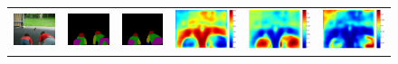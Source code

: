\begin{figure}
\begin{tabular}{c c c c c c}
   \includegraphics[height=0.1\linewidth]{fig/voc10_part/img/2010_005293.jpg} &
   \includegraphics[height=0.1\linewidth]{fig/voc10_part/res_baseline/2010_005293.png} &
   \includegraphics[height=0.1\linewidth]{fig/voc10_part/res_sharenet/2010_005293.png} &
   \includegraphics[height=0.1\linewidth]{fig/voc10_part/att1/2010_005293.pdf} &
   \includegraphics[height=0.1\linewidth]{fig/voc10_part/att2/2010_005293.pdf} &
   \includegraphics[height=0.1\linewidth]{fig/voc10_part/att3/2010_005293.pdf} \\


\end{tabular}
\end{figure}
